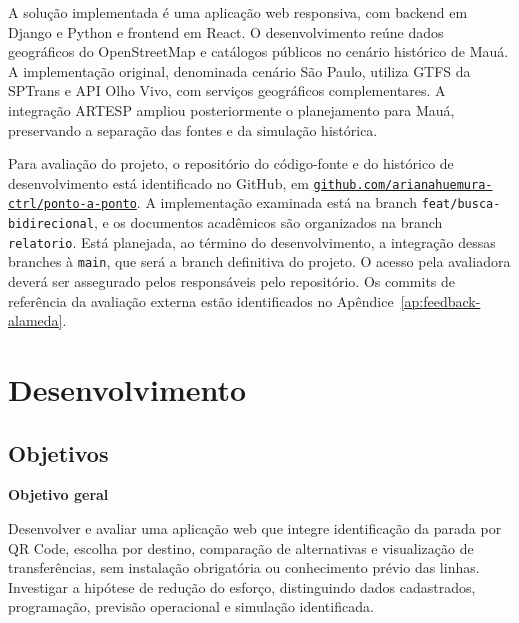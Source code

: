 \documentclass[12pt,oneside,a4paper,brazil,chapter=TITLE]{abntex2}
\let\papsection\section
\renewcommand{\section}{\clearpage\papsection}
\begin{document}
A solução implementada é uma aplicação web responsiva, com backend em Django e Python e frontend em React. O desenvolvimento reúne dados geográficos do OpenStreetMap e catálogos públicos no cenário histórico de Mauá. A implementação original, denominada cenário São Paulo, utiliza GTFS da SPTrans e API Olho Vivo, com serviços geográficos complementares. A integração ARTESP ampliou posteriormente o planejamento para Mauá, preservando a separação das fontes e da simulação histórica.

Para avaliação do projeto, o repositório do código-fonte e do histórico de desenvolvimento está identificado no GitHub, em \href{https://github.com/arianahuemura-ctrl/ponto-a-ponto}{\mbox{\texttt{github.com/arianahuemura-ctrl/ponto-a-ponto}}}. A implementação examinada está na branch \nolinkurl{feat/busca-bidirecional}, e os documentos acadêmicos são organizados na branch \texttt{relatorio}. Está planejada, ao término do desenvolvimento, a integração dessas branches à \texttt{main}, que será a branch definitiva do projeto. O acesso pela avaliadora deverá ser assegurado pelos responsáveis pelo repositório. Os commits de referência da avaliação externa estão identificados no Apêndice~\ref{ap:feedback-alameda}.

\chapter{Desenvolvimento}
\papsection{Objetivos}
\noindent\textbf{Objetivo geral}\par
Desenvolver e avaliar uma aplicação web que integre identificação da parada por QR Code, escolha por destino, comparação de alternativas e visualização de transferências, sem instalação obrigatória ou conhecimento prévio das linhas. Investigar a hipótese de redução do esforço, distinguindo dados cadastrados, programação, previsão operacional e simulação identificada.
\end{document}
